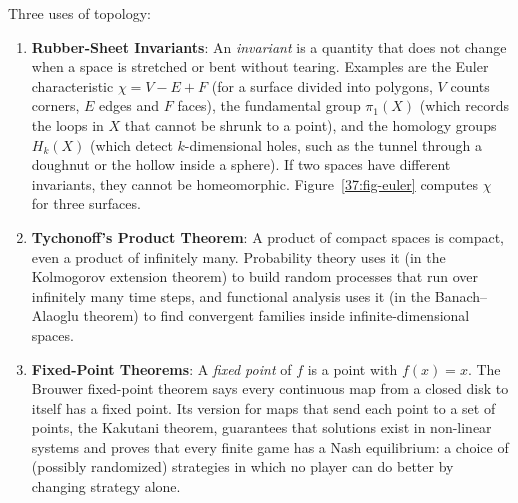 Three uses of topology:
\begin{enumerate}
  \item \textbf{Rubber-Sheet Invariants}: An \emph{invariant} is a quantity that does not change when a space is stretched or bent without tearing. Examples are the Euler characteristic $\chi = V - E + F$ (for a surface divided into polygons, $V$ counts corners, $E$ edges and $F$ faces), the fundamental group $\pi_1(X)$ (which records the loops in $X$ that cannot be shrunk to a point), and the homology groups $H_k(X)$ (which detect $k$-dimensional holes, such as the tunnel through a doughnut or the hollow inside a sphere). If two spaces have different invariants, they cannot be homeomorphic. Figure~\ref{37:fig-euler} computes $\chi$ for three surfaces.
  \item \textbf{Tychonoff's Product Theorem}: A product of compact spaces is compact, even a product of infinitely many. Probability theory uses it (in the Kolmogorov extension theorem) to build random processes that run over infinitely many time steps, and functional analysis uses it (in the Banach--Alaoglu theorem) to find convergent families inside infinite-dimensional spaces.
  \item \textbf{Fixed-Point Theorems}: A \emph{fixed point} of $f$ is a point with $f(x) = x$. The Brouwer fixed-point theorem says every continuous map from a closed disk to itself has a fixed point. Its version for maps that send each point to a set of points, the Kakutani theorem, guarantees that solutions exist in non-linear systems and proves that every finite game has a Nash equilibrium: a choice of (possibly randomized) strategies in which no player can do better by changing strategy alone.
\end{enumerate}

